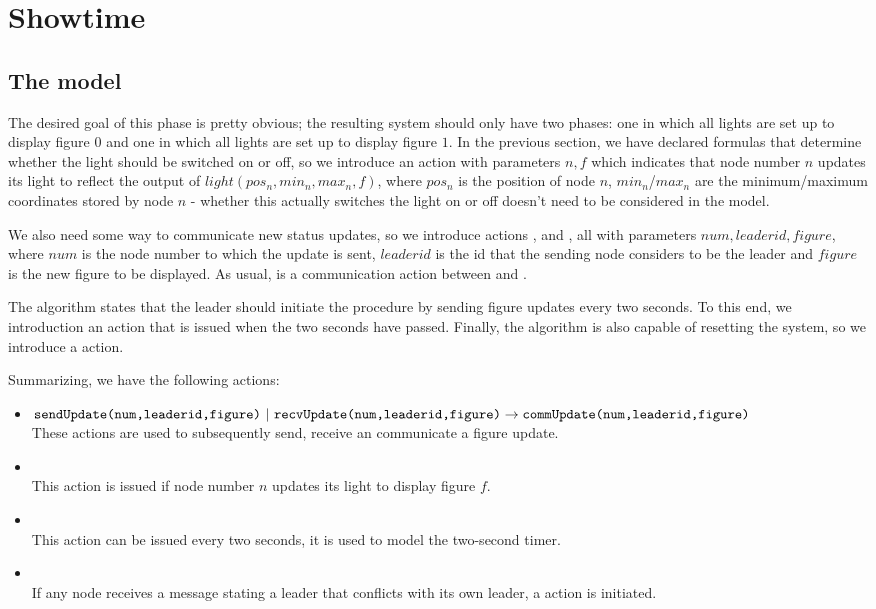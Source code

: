 \chapter{Showtime}
\label{ch:showtime}

\section{The model}
\label{model:showtime}

The desired goal of this phase is pretty obvious; the resulting system should only have two phases: one in which all lights are set up to display figure $0$ and one in which all lights are set up to display figure $1$. In the previous section, we have declared formulas that determine whether the light should be switched on or off, so we introduce an action  with parameters $n,f$ which indicates that node number $n$ updates its light to reflect the output of $light(pos_n, min_n, max_n, f)$, where $pos_n$ is the position of node $n$, $min_n$/$max_n$ are the minimum/maximum coordinates stored by node $n$ - whether this actually switches the light on or off doesn't need to be considered in the model.

We also need some way to communicate new status updates, so we introduce actions ,  and , all with parameters $num,leaderid,figure$, where $num$ is the node number to which the update is sent, $leaderid$ is the id that the sending node considers to be the leader and $figure$ is the new figure to be displayed. As usual,  is a communication action between  and .

The algorithm states that the leader should initiate the procedure by sending figure updates every two seconds. To this end, we introduction an action  that is issued when the two seconds have passed. Finally, the algorithm is also capable of resetting the system, so we introduce a  action.

Summarizing, we have the following actions:

\begin{itemize}
\item $\texttt{sendUpdate(num,leaderid,figure)} ~|~ \texttt{recvUpdate(num,leaderid,figure)}\\
       \rightarrow \texttt{commUpdate(num,leaderid,figure)}$ \\
These actions are used to subsequently send, receive an communicate a figure update.
\item {} \\
This action is issued if node number $n$ updates its light to display figure $f$.
\item {} \\
This action can be issued every two seconds, it is used to model the two-second timer.
\item {} \\
If any node receives a message stating a leader that conflicts with its own leader, a  action is initiated.
\end{itemize}

